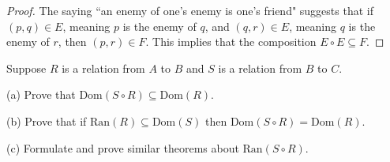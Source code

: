 \documentclass[12pt]{article}
\newenvironment{exercise}[2][Exercise]{\begin{trivlist}
\item[\hskip \labelsep {\bfseries #1}\hskip \labelsep {\bfseries #2.}]}{\end{trivlist}}
\begin{document}
\begin{proof}
	The saying ``an enemy of one's enemy is one's friend" suggests that if \( (p, q) \in E \), meaning $p$ is the enemy of $q$, and \( (q, r) \in E \), meaning $q$ is the enemy of $r$, then \( (p, r) \in F \). This implies that the composition \( E \circ E \subseteq F \).
\end{proof}

\begin{exercise}
	{9}
	Suppose \( R \) is a relation from \( A \) to \( B \) and \( S \) is a relation from \( B \) to \( C \).

(a) Prove that \( \text{Dom}(S \circ R) \subseteq \text{Dom}(R) \).

(b) Prove that if \( \text{Ran}(R) \subseteq \text{Dom}(S) \) then \( \text{Dom}(S \circ R) = \text{Dom}(R) \).

(c) Formulate and prove similar theorems about \( \text{Ran}(S \circ R) \).
\end{exercise}
\end{document}
